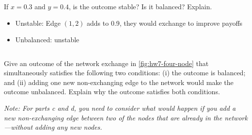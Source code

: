 \documentclass[newpages]{assignment}
\begin{document}
\subsection{}
\begin{problem}
    If \(x=0.3\) and \(y=0.4\), is the outcome stable? Is it balanced? Explain.
\end{problem}
\begin{solution}
    \begin{figure}[H]
        \centering
    \end{figure}
    \begin{itemize}
        \item[$\times$] Unstable: Edge $(1,2)$ adds to 0.9, they would exchange to improve payoffs
        \item[$\times$] Unbalanced: unstable
    \end{itemize}
\end{solution}

\subsection{}
\begin{problem}
    Give an outcome of the network exchange in \cref{fig:hw7-four-node} that simultaneously satisfies the following two conditions: (i) the outcome is balanced; and (ii) adding one new non-exchanging edge to the network would make the outcome unbalanced. Explain why the outcome satisfies both conditions.

    \textit{Note: For parts c and d, you need to consider what would happen if you add a new non-exchanging edge between two of the nodes that are already in the network—without adding any new nodes.}
\end{problem}
\end{document}
